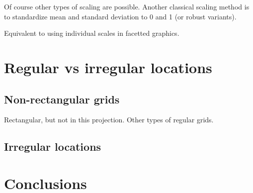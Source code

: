 \documentclass[oneside]{article}
\begin{document}
Of course other types of scaling are possible. Another classical scaling method is to standardize mean and standard deviation to 0 and 1 (or robust variants).

Equivalent to using individual scales in facetted graphics. 

\section{Regular vs irregular locations}

\subsection{Non-rectangular grids}

Rectangular, but not in this projection.  Other types of regular grids.

\subsection{Irregular locations}

\section{Conclusions}


\end{document}
